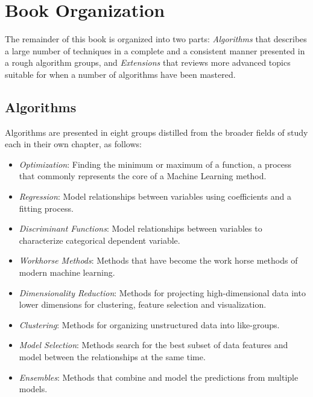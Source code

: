 
\section{Book Organization} 
\label{intro:organization}
The remainder of this book is organized into two parts: \emph{Algorithms} that describes a large number of techniques in a complete and a consistent manner presented in a rough algorithm groups, and \emph{Extensions} that reviews more advanced topics suitable for when a number of algorithms have been mastered.

% 
%
\subsection{Algorithms}
Algorithms are presented in eight groups distilled from the broader fields of study each in their own chapter, as follows: 

\begin{itemize}
	\item \emph{Optimization}: Finding the minimum or maximum of a function, a process that commonly represents the core of a Machine Learning method.
	\item \emph{Regression}: Model relationships between variables using coefficients and a fitting process.
	\item \emph{Discriminant Functions}:	Model relationships between variables to characterize categorical dependent variable.
	\item \emph{Workhorse Methods}: Methods that have become the work horse methods of modern machine learning.
	\item \emph{Dimensionality Reduction}: Methods for projecting high-dimensional data into lower dimensions for clustering, feature selection and visualization.
	\item \emph{Clustering}: Methods for organizing unstructured data into like-groups.
	\item \emph{Model Selection}: Methods search for the best subset of data features and model between the relationships at the same time.
	\item \emph{Ensembles}:	Methods that combine and model the predictions from multiple models.
\end{itemize}

